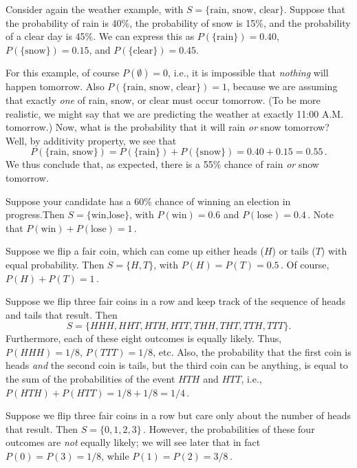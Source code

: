 \begin{example}
    Consider again the weather example, with $S = \{\text{rain, snow, clear}\}$. Suppose that the probability of rain is 40\%, the probability of snow is 15\%, and the probability of a clear day is 45\%. We can express this as $P(\{\text{rain}\})=0.40$, $P(\{\text{snow}\})=0.15$, and $P(\{\text{clear}\})=0.45$.

    For this example, of course $P(\emptyset)=0$, i.e., it is impossible that \emph{nothing} will happen tomorrow. Also $P(\{\text{rain, snow, clear}\})=1$, because we are assuming that exactly \emph{one} of rain, snow, or clear must occur tomorrow. (To be more realistic, we might say that we are predicting the weather at exactly 11:00 A.M. tomorrow.) Now, what is the probability that it will rain \emph{or} snow tomorrow? Well, by additivity property, we see that
    $$
    P(\{\text{rain, snow}\}) = P(\{\text{rain}\}) + P(\{\text{snow}\}) = 0.40 + 0.15 = 0.55\,.
    $$
    We thus conclude that, as expected, there is a 55\% chance of rain \emph{or} snow tomorrow.
\end{example}

\begin{example}
    Suppose your candidate has a 60\% chance of winning an election in progress.Then $S=\{\text{win,lose}\}$, with $P(\text{win})=0.6$ and $P(\text{lose})=0.4$\,. Note that $P(\text{win})+P(\text{lose})=1$\,.
\end{example}

\begin{example}
    Suppose we flip a fair coin, which can come up either heads ($H$) or tails ($T$) with equal probability. Then $S=\{H, T\}$, with $P(H)=P(T)=0.5$\,. Of course, $P(H)+P(T)=1$\,.
\end{example}

\begin{example}
    Suppose we flip three fair coins in a row and keep track of the sequence of heads and tails that result. Then
    $$
    S = \{HHH, HHT, HTH, HTT, THH, THT, TTH, TTT\}.
    $$
    Furthermore, each of these eight outcomes is equally likely. Thus, $P(HHH)=1/8$, $P(TTT)=1/8$, etc. Also, the probability that the first coin is heads \emph{and} the second coin is tails, but the third coin can be anything, is equal to the sum of the probabilities of the event $HTH$ and $HTT$, i.e., $P(HTH)+P(HTT)=1/8+1/8=1/4$\,.
\end{example}

\begin{example}
    Suppose we flip three fair coins in a row but care only about the number of heads that result. Then $S=\{0,1,2,3\}$\,. However, the probabilities of these four outcomes are \emph{not} equally likely; we will see later that in fact $P(0)=P(3)=1/8$, while $P(1)=P(2)=3/8$\,.
\end{example}


